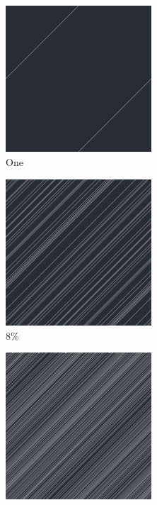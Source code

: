 \documentclass[12pt, fleqn]{report}                             %
\theoremstyle{break}                                            %
\begin{document}
      \begin{figure}[ht!]
        \centering
        \begin{subfigure}[b]{0.4\linewidth}
          \includegraphics[width=0.6\textwidth]{Images/130/a.png}
          \caption{One}
        \end{subfigure}
        \begin{subfigure}[b]{0.4\linewidth}
          \includegraphics[width=0.6\textwidth]{Images/130/b.png}
          \caption{8\%}
        \end{subfigure}
        \begin{subfigure}[b]{0.4\linewidth}
          \includegraphics[width=0.6\textwidth]{Images/130/c.png}

\end{subfigure}
\end{figure}
\end{document}
